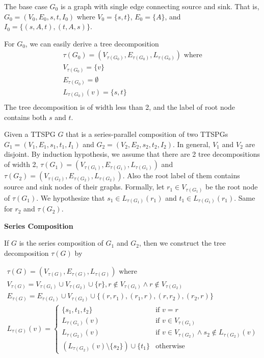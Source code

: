 \documentclass[10pt]{homework}
\begin{document}
\begin{induction}
\basecase
The base case \(G_0\) is a graph with single edge connecting source and sink.
That is, \(G_0 = (V_0, E_0, s, t, I_0)\) where \(V_0 = \{s, t\}\),
\(E_0 = \{A\}\), and \(I_0 = \{(s, A, t), (t, A, s)\}\).

For \(G_0\), we can easily derive a tree decomposition
\[
\begin{array}{l}
\tau(G_0) = (V_{\tau(G_0)}, E_{\tau(G_0)}, L_{\tau(G_0)}) \text{ where} \\
V_{\tau(G_0)} = \{v\} \\
E_{\tau(G_0)} = \emptyset \\
L_{\tau(G_0)}(v) = \{s, t\}\\
\end{array}
\]
The tree decomposition is of width less than 2,
and the label of root node contains both \(s\) and \(t\).

\indstep
Given a TTSPG \(G\) that is a series-parallel composition of two TTSPGs 
\(G_1 = (V_1, E_1, s_1, t_1, I_1)\) and \(G_2 = (V_2, E_2, s_2, t_2, I_2)\).
In general, \(V_1\) and \(V_2\) are disjoint.
By induction hypothesis, we assume that there are 2 tree decompositions of width 2,
\(\tau(G_1) = (V_{\tau(G_1)}, E_{\tau(G_1)}, L_{\tau(G_1)})\)
and \(\tau(G_2) = (V_{\tau(G_2)}, E_{\tau(G_2)}, L_{\tau(G_2)})\).
Also the root label of them contains source and sink nodes of their graphs.
Formally, let \(r_1 \in V_{\tau(G_1)}\) be the root node of \(\tau(G_1)\).
We hypothesize that \(s_1 \in L_{\tau(G_1)}(r_1)\) and \(t_1 \in L_{\tau(G_1)}(r_1)\).
Same for \(r_2\) and \(\tau(G_2)\).

\textbf{Series Composition}

If \(G\) is the series composition of \(G_1\) and \(G_2\),
then we construct the tree decomposition \(\tau(G)\) by 

\[
\begin{array}{l}
	\tau(G) = (V_{\tau(G)}, E_{\tau(G)}, L_{\tau(G)}) \text{ where}                                                \\
	V_{\tau(G)} = V_{\tau(G_1)} \cup V_{\tau(G_2)} \cup \{r\}, r \notin V_{\tau(G_1)} \land r \notin V_{\tau(G_2)} \\
	E_{\tau(G)} = E_{\tau(G_1)} \cup V_{\tau(G_2)} \cup \{(r, r_1), (r_1, r), (r, r_2), (r_2, r)\}                 \\
	L_{\tau(G)}(v) = \left\{
\begin{array}{ll}
	\{s_1, t_1, t_2\}                                 & \text{if } v = r                                                \\
	L_{\tau(G_1)}(v)                                  & \text{if } v \in V_{\tau(G_1)}                                   \\
	L_{\tau(G_2)}(v)                                  & \text{if } v \in V_{\tau(G_2)}\land s_2 \notin L_{\tau(G_2)}(v) \\
	(L_{\tau(G_2)}(v) \setminus \{s_2\}) \cup \{t_1\} & \text{otherwise}
\end{array}\right.  \\
\end{array}
\]


\end{induction}
\end{document}
